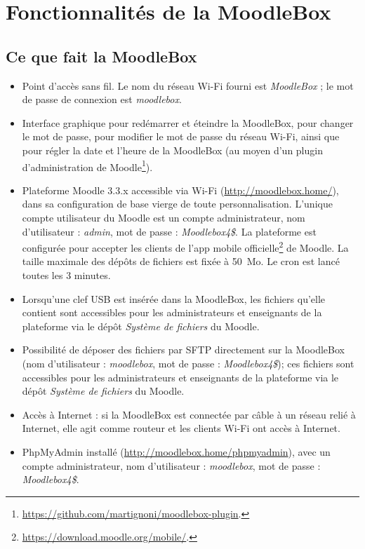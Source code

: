 \documentclass[11pt]{article}
\begin{document}
\section{Fonctionnalités de la MoodleBox}

\subsection{Ce que fait la MoodleBox}

\begin{itemize}
\item Point d'accès sans fil. Le nom du réseau Wi-Fi fourni est \emph{MoodleBox} ; le mot de passe de connexion est \emph{moodlebox}.
\item Interface graphique pour redémarrer et éteindre la MoodleBox, pour changer le mot de passe, pour modifier le mot de passe du réseau Wi-Fi, ainsi que pour régler la date et l'heure de la MoodleBox (au moyen d'un plugin d'administration de Moodle\footnote{\url{https://github.com/martignoni/moodlebox-plugin}.}).
\item Plateforme Moodle 3.3.x accessible via Wi-Fi (\url{http://moodlebox.home/}), dans sa configuration de base vierge de toute personnalisation. L'unique compte utilisateur du Moodle est un compte administrateur, nom d'utilisateur : \emph{admin}, mot de passe : \emph{Moodlebox4\$}. La plateforme est configurée pour accepter les clients de l'app mobile officielle\footnote{\url{https://download.moodle.org/mobile/}.} de Moodle. La taille maximale des dépôts de fichiers est fixée à 50~Mo. Le cron est lancé toutes les 3 minutes.
\item Lorsqu'une clef USB est insérée dans la MoodleBox, les fichiers qu'elle contient sont accessibles pour les administrateurs et enseignants de la plateforme via le dépôt \emph{Système de fichiers} du Moodle.
\item Possibilité de déposer des fichiers par SFTP directement sur la MoodleBox (nom d'utilisateur : \emph{moodlebox}, mot de passe : \emph{Moodlebox4\$}); ces fichiers sont accessibles pour les administrateurs et enseignants de la plateforme via le dépôt \emph{Système de fichiers} du Moodle.
\item Accès à Internet : si la MoodleBox est connectée par câble à un réseau relié à Internet, elle agit comme routeur et les clients Wi-Fi ont accès à Internet.
\item PhpMyAdmin installé (\url{http://moodlebox.home/phpmyadmin}), avec un compte administrateur, nom d'utilisateur : \emph{moodlebox}, mot de passe : \emph{Moodlebox4\$}.
\end{itemize}
\end{document}
